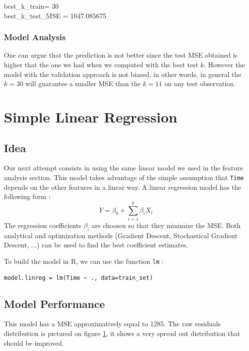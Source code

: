 \documentclass[]{report}
\newcommand{\inputtikz}[2]{%
	\scalebox{#1}{}  
}
\begin{document}
\begin{center} 
	best\_k\_train= 30 \\
	best\_k\_test\_MSE = 1047.085675
\end{center}

\subsubsection{Model Analysis}
One can argue that the prediction is not better since the test MSE obtained is higher that the one we had when we computed with the best test $k$. However the model with the validation approach is not biased, in other words, in general the $k=30$ will guarantee a smaller MSE than the $k=11$ on any test observation.

\section{Simple Linear Regression}
\subsection{Idea}
Our next attempt consists in using the same linear model we used in the feature analysis section. This model takes advantage of the simple assumption that \texttt{Time} depends on the other features in a linear way. A linear regression model has the following form :
$$
	Y = \beta_0 + \sum_{i = 1}^{p} \beta_i X_i
$$
The regression coefficients $\beta_i$ are choosen so that they minimize the MSE. Both analytical and optimization methods (Gradient Descent, Stochastical Gradient Descent, ...) can be used to find the best coefficient estimates.

To build the model in R, we can use the function \texttt{lm} :
\begin{lstlisting}
model.linreg = lm(Time ~ ., data=train_set)
\end{lstlisting}

\subsection{Model Performance}
This model has a MSE approximatively equal to 1285. The raw residuals distribution is pictured on figure \ref{fig:linreg_hist}, it shows a very spread out distribution that should be improved.

\begin{figure}[!h]
	\centering
	\inputtikz{0.5}{Figures/linreg_hist.tex}
	\caption{}
	\label{fig:linreg_hist}
\end{figure}
\end{document}
